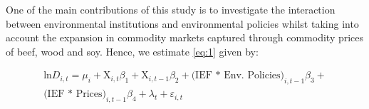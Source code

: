 
	





One of the main contributions of this study is to investigate the interaction between environmental institutions and environmental policies whilst taking into account the expansion in commodity markets captured through commodity prices of beef, wood and soy. Hence, we estimate \eqref{eq:1} given by:





\begin{equation}
\begin{gathered}
\text{ln}D_{i,t} = \mu_{i} + \text{X}_{i,t}\beta_{1} + \text{X}_{i,t-1}\beta_{2}  + \text{(IEF * Env. Policies)}_{i,t-1} \beta_{3} + \\ \text{(IEF * Prices)}_{i,t-1}  \beta_{4} + \lambda_{t} + \varepsilon_{i,t} \label{eq:2} 
\end{gathered}
\end{equation}




